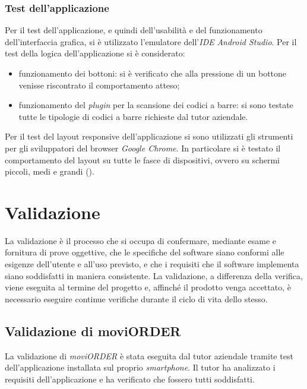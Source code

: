 \subsubsection{Test dell'applicazione}

Per il test dell'applicazione, e quindi dell'usabilità e del funzionamento dell'interfaccia grafica, si è utilizzato l'emulatore dell'\textit{IDE} \textit{Android Studio}. Per il test della logica dell'applicazione si è considerato:
\begin{itemize}
	\item funzionamento dei bottoni: si è verificato che alla pressione di un bottone venisse riscontrato il comportamento atteso;
	\item funzionamento del \textit{plugin} per la scansione dei codici a barre: si sono testate tutte le tipologie di codici a barre richieste dal tutor aziendale.
\end{itemize}

Per il test del layout responsive dell'applicazione si sono utilizzati gli strumenti per gli sviluppatori del browser \textit{Google Chrome}. In particolare si è testato il comportamento del layout su tutte le fasce di dispositivi, ovvero su schermi piccoli, medi e grandi ().

\section{Validazione}

La validazione è il processo che si occupa di confermare, mediante esame e fornitura di prove oggettive, che le specifiche del software siano conformi alle esigenze dell'utente e all'uso previsto, e che i requisiti che il software implementa siano soddisfatti in maniera consistente.
La validazione, a differenza della verifica, viene eseguita al termine del progetto e, affinché il prodotto venga accettato, è necessario eseguire continue verifiche durante il ciclo di vita dello stesso.

\subsection{Validazione di moviORDER}

La validazione di \textit{moviORDER} è stata eseguita dal tutor aziendale tramite test dell'applicazione installata sul proprio \textit{smartphone}. Il tutor ha analizzato i requisiti dell'applicazione e ha verificato che fossero tutti soddisfatti.